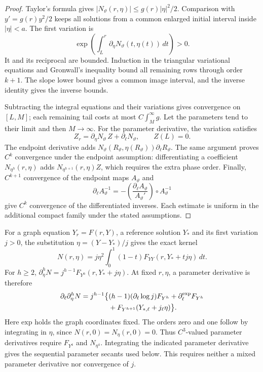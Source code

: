 \begin{proof}
Taylor's formula gives \(|N_\vartheta(r,\eta)|\le g(r)|\eta|^2/2\).
Comparison with \(y'=g(r)y^2/2\) keeps all solutions from a common
enlarged initial interval inside \(|\eta|<a\). The first variation is
\[
 \exp\left(\int_L^r
          \partial_\eta N_\vartheta(t,\eta(t))\,dt\right)>0.
\]
It and its reciprocal are bounded. Induction in the triangular
variational equations and Gronwall's inequality bound all remaining
rows through order \(k+1\). The slope lower bound gives a common
image interval, and the inverse identity gives the inverse bounds.

Subtracting the integral equations and their variations gives convergence
on \([L,M]\); each remaining tail costs at most \(C\int_M^\infty g\).
Let the parameters tend to their limit and then \(M\to\infty\).
For the parameter derivative, the variation satisfies
\[
 Z_r=\partial_\eta N_\vartheta\,Z+\partial_\ell N_\vartheta,
 \qquad Z(L)=0.
\]
The endpoint derivative adds
\(N_\vartheta(R_\vartheta,\eta(R_\vartheta))
\partial_\ell R_\vartheta\). The same argument proves \(C^k\)
convergence under the endpoint assumption: differentiating a coefficient
\(N_{\eta^h}(r,\eta)\) adds
\(N_{\eta^{h+1}}(r,\eta)Z\), which requires the extra phase order.
Finally, \(C^{k+1}\) convergence of the endpoint maps \(A_\vartheta\) and
\[
 \partial_\ell A_\vartheta^{-1}
 =-\left(\frac{\partial_\ell A_\vartheta}{A_\vartheta'}\right)
     \circ A_\vartheta^{-1}
\]
give \(C^k\) convergence of the differentiated inverses. Each estimate
is uniform in the additional compact family under the stated assumptions.
\end{proof}

For a graph equation \(Y_r=F(r,Y)\), a reference solution \(Y_*\)
and its first variation \(j>0\), the substitution
\(\eta=(Y-Y_*)/j\) gives the exact kernel
\begin{equation}\label{tail:normalized-kernel}
 N(r,\eta)=j\eta^2\int_0^1(1-t)
                  F_{YY}(r,Y_*+tj\eta)\,dt.
\end{equation}
For \(h\ge2\), \(\partial_\eta^hN=j^{h-1}F_{Y^h}(r,Y_*+j\eta)\).
At fixed \(r,\eta\), a parameter derivative is therefore
\begin{equation}\label{deg:det-parameter-phase-derivative}
\begin{split}
 \partial_\ell\partial_\eta^hN
 =j^{h-1}\bigl\{&(h-1)(\partial_\ell\log j)F_{Y^h}
 +\partial_\ell^{\rm exp}F_{Y^h}\\
 &+F_{Y^{h+1}}(Y_{*,\ell}+j_\ell\eta)\bigr\}.
\end{split}
\end{equation}
Here \(\mathrm{exp}\) holds the graph coordinates fixed. The orders
zero and one follow by integrating in \(\eta\), since
\(N(r,0)=N_\eta(r,0)=0\). Thus \(C^3\)-valued parameter
derivatives require \(F_{Y^4}\) and \(N_{\eta^4}\).
Integrating the indicated parameter derivative gives the sequential
parameter secants used below. This requires neither a mixed parameter
derivative nor convergence of \(j\).

